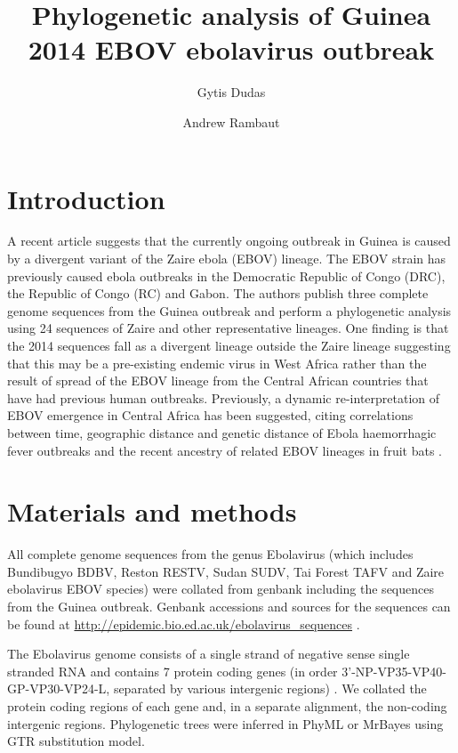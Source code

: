 \documentclass[11pt,oneside,letterpaper]{article}
\title{\vspace{1.0cm} \LARGE \bf Phylogenetic analysis of Guinea 2014 EBOV ebolavirus outbreak}
\author[1]{Gytis Dudas}
\author[1,2,3]{Andrew Rambaut}
\affil[1]{Institute of Evolutionary Biology, University of Edinburgh, Edinburgh, UK}
\affil[2]{Fogarty International Center, National Institutes of Health, Bethesda, MD, USA}
\affil[3]{Centre for Immunology, Infection and Evolution at the University of Edinburgh, Edinburgh, UK}
\begin{document}
\maketitle

\section*{Introduction}
A recent article \cite{baize2014} suggests that the currently ongoing outbreak in Guinea is caused by a divergent variant of the Zaire ebola (EBOV) lineage. The EBOV strain has previously caused ebola outbreaks in the Democratic Republic of Congo (DRC), the Republic of Congo (RC) and Gabon. The authors publish three complete genome sequences from the Guinea outbreak and perform a phylogenetic analysis using 24 sequences of Zaire and other representative lineages. One finding is that the 2014 sequences fall as a divergent lineage outside the Zaire lineage suggesting that this may be a pre-existing endemic virus in West Africa rather than the result of spread of the EBOV lineage from the Central African countries that have had previous human outbreaks.
Previously, a dynamic re-interpretation of EBOV emergence in Central Africa has been suggested, citing correlations between time, geographic distance and genetic distance of Ebola haemorrhagic fever outbreaks \cite{walsh2005} and the recent ancestry of related EBOV lineages in fruit bats \cite{biek2006}.

\section*{Materials and methods}
All complete genome sequences from the genus Ebolavirus (which includes Bundibugyo BDBV, Reston RESTV, Sudan SUDV, Tai Forest TAFV and Zaire ebolavirus EBOV species) were collated from genbank including the sequences from the Guinea outbreak.
Genbank accessions and sources for the sequences can be found at \url{http://epidemic.bio.ed.ac.uk/ebolavirus_sequences} .

The Ebolavirus genome consists of a single strand of negative sense single stranded RNA and contains 7 protein coding genes (in order 3'-NP-VP35-VP40-GP-VP30-VP24-L, separated by various intergenic regions) \cite{sanchez1993}. We collated the protein coding regions of each gene and, in a separate alignment, the non-coding intergenic regions. Phylogenetic trees were inferred in PhyML \cite{guindon2003} or MrBayes \cite{huelsenbeck2001} using GTR \cite{tavare1986} substitution model.
\end{document}
